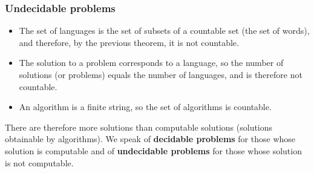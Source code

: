 \documentclass[compress,dvipdfmx]{beamer}
\begin{document}
%
\begin{frame}
\frametitle{Undecidable problems}

\begin{itemize}

  \item The set of languages is the set of subsets of a countable
  set (the set of words), and therefore, by the previous theorem, it
  is not countable.

  \item The solution to a problem corresponds to a language, so the
  number of solutions (or problems) equals the number of languages,
  and is therefore not countable.

  \item An algorithm is a finite string, so the set of algorithms is
  countable.

\end{itemize}

There are therefore more solutions than computable solutions
(solutions obtainable by algorithms). We speak of \textbf{decidable
  problems} for those whose solution is computable and of
\textbf{undecidable problems} for those whose solution is not
computable.

\end{frame}
\end{document}
